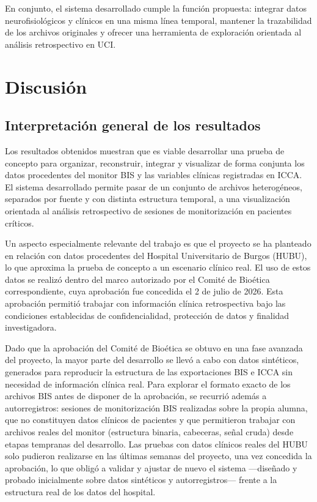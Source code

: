 \documentclass[
  spanish,
  a4paper,
  12pt,
  twoside]{memoir}
\newcommand{\capitulo}[2]{%
  \setcounter{chapter}{#1}%
  \setcounter{section}{0}%
  \setcounter{figure}{0}%
  \setcounter{table}{0}%
  \chapter*{#2}%
  \addcontentsline{toc}{chapter}{#2}%
  \markboth{#2}{#2}%
}
\begin{document}
En conjunto, el sistema desarrollado cumple la función propuesta:
integrar datos neurofisiológicos y clínicos en una misma línea temporal,
mantener la trazabilidad de los archivos originales y ofrecer una
herramienta de exploración orientada al análisis retrospectivo en UCI.

\capitulo{6}{Discusión}

\section{Interpretación general de los
resultados}\label{interpretaciuxf3n-general-de-los-resultados}

Los resultados obtenidos muestran que es viable desarrollar una prueba
de concepto para organizar, reconstruir, integrar y visualizar de forma
conjunta los datos procedentes del monitor BIS y las variables clínicas
registradas en ICCA. El sistema desarrollado permite pasar de un
conjunto de archivos heterogéneos, separados por fuente y con distinta
estructura temporal, a una visualización orientada al análisis
retrospectivo de sesiones de monitorización en pacientes críticos.

Un aspecto especialmente relevante del trabajo es que el proyecto se ha
planteado en relación con datos procedentes del Hospital Universitario
de Burgos (HUBU), lo que aproxima la prueba de concepto a un escenario
clínico real. El uso de estos datos se realizó dentro del marco
autorizado por el Comité de Bioética correspondiente, cuya aprobación
fue concedida el 2 de julio de 2026. Esta aprobación permitió trabajar
con información clínica retrospectiva bajo las condiciones establecidas
de confidencialidad, protección de datos y finalidad investigadora.

Dado que la aprobación del Comité de Bioética se obtuvo en una fase
avanzada del proyecto, la mayor parte del desarrollo se llevó a cabo con
datos sintéticos, generados para reproducir la estructura de las
exportaciones BIS e ICCA sin necesidad de información clínica real. Para
explorar el formato exacto de los archivos BIS antes de disponer de la
aprobación, se recurrió además a autorregistros: sesiones de
monitorización BIS realizadas sobre la propia alumna, que no constituyen
datos clínicos de pacientes y que permitieron trabajar con archivos
reales del monitor (estructura binaria, cabeceras, señal cruda) desde
etapas tempranas del desarrollo. Las pruebas con datos clínicos reales
del HUBU solo pudieron realizarse en las últimas semanas del proyecto,
una vez concedida la aprobación, lo que obligó a validar y ajustar de
nuevo el sistema ---diseñado y probado inicialmente sobre datos
sintéticos y autorregistros--- frente a la estructura real de los datos
del hospital.
\end{document}
